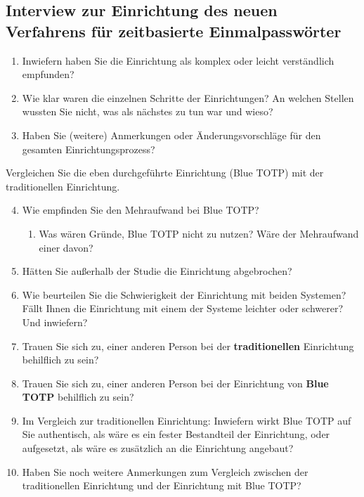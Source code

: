 \subsection{Interview zur Einrichtung des neuen Verfahrens für zeitbasierte Einmalpasswörter}
\label{anh: interview einrichtung}

\begin{enumerate}
    \item Inwiefern haben Sie die Einrichtung als komplex oder leicht verständlich empfunden?
    \item Wie klar waren die einzelnen Schritte der Einrichtungen? An welchen Stellen wussten Sie nicht, was als nächstes zu tun war und wieso?
    \item Haben Sie (weitere) Anmerkungen oder Änderungsvorschläge für den gesamten Einrichtungsprozess?
\end{enumerate}
Vergleichen Sie die eben durchgeführte Einrichtung (Blue TOTP) mit der traditionellen Einrichtung.
\begin{enumerate}
    \setcounter{enumi}{3}
    \item Wie empfinden Sie den Mehraufwand bei Blue TOTP?
    \begin{enumerate}
        \item Was wären Gründe, Blue TOTP nicht zu nutzen? Wäre der Mehraufwand einer davon?
    \end{enumerate}
    \item Hätten Sie außerhalb der Studie die Einrichtung abgebrochen?
    \item Wie beurteilen Sie die Schwierigkeit der Einrichtung mit beiden Systemen? Fällt Ihnen die Einrichtung mit einem der Systeme leichter oder schwerer? Und inwiefern?
    \item Trauen Sie sich zu, einer anderen Person bei der \textbf{traditionellen} Einrichtung behilflich zu sein?
    \item Trauen Sie sich zu, einer anderen Person bei der Einrichtung von \textbf{Blue TOTP} behilflich zu sein?
    \item Im Vergleich zur traditionellen Einrichtung: Inwiefern wirkt Blue TOTP auf Sie authentisch, als wäre es ein fester Bestandteil der Einrichtung, oder aufgesetzt, als wäre es zusätzlich an die Einrichtung \glqq angebaut\grqq{}?
    \item Haben Sie noch weitere Anmerkungen zum Vergleich zwischen der traditionellen Einrichtung und der Einrichtung mit Blue TOTP?
\end{enumerate}

